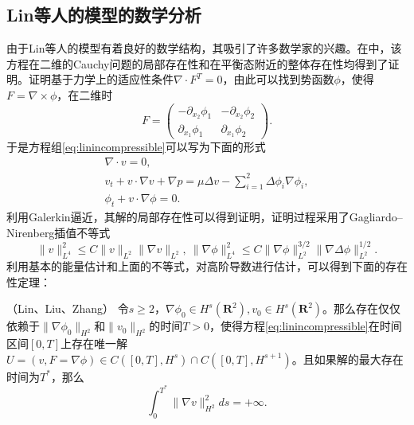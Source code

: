 \subsection{Lin等人的模型的数学分析}
由于Lin等人的模型有着良好的数学结构，其吸引了许多数学家的兴趣\cite{lin2005hydrodynamics,lebon2008classical,qian2010well,qian2011initial,hu2012formation,hu2015global}。在\cite{lin2005hydrodynamics}中，该方程在二维的Cauchy问题的局部存在性和在平衡态附近的整体存在性均得到了证明。证明基于力学上的适应性条件$\nabla \cdot F^T=0$，由此可以找到势函数$\phi$，使得$F = \nabla \times \phi$，在二维时
\begin{equation*}
	F = \left( \begin{matrix}
		-\partial_{x_2} \phi_1 &　-\partial_{x_2} \phi_2 \\
		\partial_{x_1} \phi_1 & \partial_{x_1} \phi_2
	\end{matrix}\right).
\end{equation*}
于是方程组\eqref{eq:linincompressible}可以写为下面的形式
\begin{eqnarray*}
	\nabla \cdot v = 0, \\
	v_t + v \cdot \nabla v + \nabla p =  \mu \Delta v - \sum_{i=1}^2 \Delta \phi_i \nabla \phi_i, \\
	\phi_t + v \cdot \nabla \phi = 0.
\end{eqnarray*}
利用Galerkin逼近，其解的局部存在性可以得到证明\cite{lin2005hydrodynamics}，证明过程采用了Gagliardo–Nirenberg插值不等式
\begin{equation*}
	\|v\|_{L^4}^2 \le C \|v\|_{L^2} \| \nabla v\|_{L^2} ,\ \|\nabla \phi\|_{L^4}^2 \le C \|\nabla \phi\|_{L^2}^{3/2} \|\nabla \Delta \phi\|_{L^2}^{1/2}.
\end{equation*}
利用基本的能量估计和上面的不等式，对高阶导数进行估计，可以得到下面的存在性定理：
\begin{theorem}（Lin、Liu、Zhang\cite{lin2005hydrodynamics}）
	令$s \ge 2$，$\nabla \phi_0 \in H^s(\mathbf{R}^2),v_0 \in H^s(\mathbf{R}^2)$。那么存在仅仅依赖于$\|\nabla \phi_0\|_{H^2}$和$\|v_0\|_{H^2}$的时间$T>0$，使得方程\eqref{eq:linincompressible}在时间区间$[0,T]$上存在唯一解$U=(v,F=\nabla \phi) \in C([0,T],H^s) \cap C([0,T],H^{s+1})$。且如果解的最大存在时间为$T^*$，那么
	\begin{equation*}
		\int_0^{T^*} \|\nabla v\|_{H^2}^2 ds = + \infty.
	\end{equation*}
\end{theorem}

